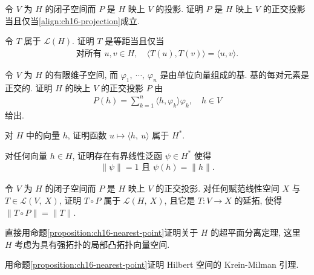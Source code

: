 \documentclass[../../main.tex]{subfiles}
\begin{document}
\begin{exercise}\label{exercise:ch16-08}
令 $V$ 为 $H$ 的闭子空间而 $P$ 是 $H$ 映上 $V$ 的投影. 证明 $P$ 是 $H$ 映上 $V$ 的正交投影当且仅当\eqref{align:ch16-projection}成立.
\end{exercise}

\begin{exercise}\label{exercise:ch16-09}
令 $T$ 属于 $\mathcal{L}(H)$. 证明 $T$ 是等距当且仅当
\begin{align*}
\text{对所有 }u,v\in H,\quad\langle T(u),T(v)\rangle=\langle u,v\rangle.
\end{align*}
\end{exercise}

\begin{exercise}\label{exercise:ch16-10}
令 $V$ 为 $H$ 的有限维子空间, 而 $\varphi_{1},\ \cdots,\ \varphi_{n}$ 是由单位向量组成的基. 基的每对元素是正交的. 证明 $H$ 的映上 $V$ 的正交投影 $P$ 由
\begin{align*}
P(h)=\sum_{k=1}^{n}\langle h,\varphi_{k}\rangle\varphi_{k},\quad h\in V
\end{align*}
给出.
\end{exercise}

\begin{exercise}\label{exercise:ch16-11}
对 $H$ 中的向量 $h$, 证明函数 $u\mapsto\langle h,\ u\rangle$ 属于 $H^{*}$.
\end{exercise}

\begin{exercise}\label{exercise:ch16-12}
对任何向量 $h\in H$, 证明存在有界线性泛函 $\psi\in H^{*}$ 使得
\begin{align*}
\|\psi\|=1\text{ 且 }\psi(h)=\|h\|.
\end{align*}
\end{exercise}

\begin{exercise}\label{exercise:ch16-13}
令 $V$ 为 $H$ 的闭子空间而 $P$ 是 $H$ 映上 $V$ 的正交投影. 对任何赋范线性空间 $X$ 与 $T\in\mathcal{L}(V,\ X)$, 证明 $T\circ P$ 属于 $\mathcal{L}(H,\ X)$, 且它是 $T:V\to X$ 的延拓, 使得 $\|T\circ P\|=\|T\|$.
\end{exercise}

\begin{exercise}\label{exercise:ch16-14}
直接用命题\cref{proposition:ch16-nearest-point}证明关于 $H$ 的超平面分离定理, 这里 $H$ 考虑为具有强拓扑的局部凸拓扑向量空间.
\end{exercise}

\begin{exercise}\label{exercise:ch16-15}
用命题\cref{proposition:ch16-nearest-point}证明 Hilbert 空间的 Krein-Milman 引理.
\end{exercise}
\end{document}
